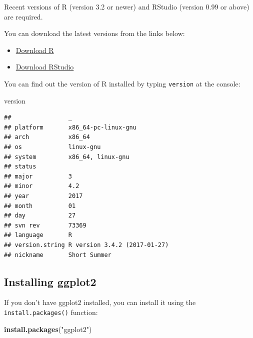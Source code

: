 \documentclass[]{article}
\newenvironment{Shaded}{\begin{snugshade}}{\end{snugshade}}
\newcommand{\KeywordTok}[1]{\textcolor[rgb]{0.13,0.29,0.53}{\textbf{{#1}}}}
\newcommand{\StringTok}[1]{\textcolor[rgb]{0.31,0.60,0.02}{{#1}}}
\newcommand{\NormalTok}[1]{{#1}}
\providecommand{\tightlist}{%
  \setlength{\itemsep}{0pt}\setlength{\parskip}{0pt}}
\theoremstyle{definition}
\theoremstyle{definition}
\theoremstyle{definition}
\theoremstyle{remark}
\begin{document}
Recent versions of R (version 3.2 or newer) and RStudio (version 0.99 or
above) are required.

You can download the latest versions from the links below:

\begin{itemize}
\tightlist
\item
  \href{https://cran.r-project.org}{Download R}
\item
  \href{https://www.rstudio.com/products/rstudio/download}{Download
  RStudio}
\end{itemize}

You can find out the version of R installed by typing \texttt{version}
at the console:

\begin{Shaded}
\begin{Highlighting}[]
\NormalTok{version}
\end{Highlighting}
\end{Shaded}

\begin{verbatim}
##                _                           
## platform       x86_64-pc-linux-gnu         
## arch           x86_64                      
## os             linux-gnu                   
## system         x86_64, linux-gnu           
## status                                     
## major          3                           
## minor          4.2                         
## year           2017                        
## month          01                          
## day            27                          
## svn rev        73369                       
## language       R                           
## version.string R version 3.4.2 (2017-01-27)
## nickname       Short Summer
\end{verbatim}

\subsection{Installing ggplot2}\label{installing-ggplot2}

If you don't have ggplot2 installed, you can install it using the
\texttt{install.packages()} function:

\begin{Shaded}
\begin{Highlighting}[]
\KeywordTok{install.packages}\NormalTok{(}\StringTok{"ggplot2"}\NormalTok{)}
\end{Highlighting}
\end{Shaded}
\end{document}
